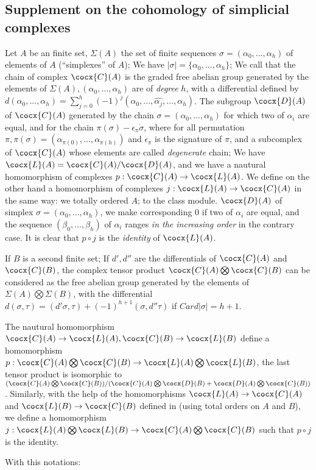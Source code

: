 \subsection{Supplement on the cohomology of simplicial complexes}
\label{subsection:0.11.8}
\begin{env}[11.8.1]
Let $A$ be an finite set, $\Sigma(A)$ the set of finite sequences $\sigma = (\alpha_0, ..., \alpha_h)$ of elements of $A$ (``simplexes'' of $A$);
We have $|\sigma| = \{\alpha_0, ..., \alpha_h\}$;
We call that the chain of complex $\cocx{C}(A)$ is the graded free abelian group generated by the elements of $\Sigma(A), (\alpha_0, ..., \alpha_h)$ are of \emph{degree} $h$, 
with a differential defined by $d(\alpha_0, ..., \alpha_h) = \sum_{j=0}^{h} (-1)^j(\alpha_0, ..., \hat{\alpha_j}, ..., \alpha_h)$.
The subgroup $\cocx{D}(A)$ of $\cocx{C}(A)$ generated by the chain $\sigma = (\alpha_0, ..., \alpha_h)$ for which two of $\alpha_i$ are equal, 
and for the chain $\pi(\sigma) - \epsilon_\pi \dot \sigma$, where for all permutation $\pi, \pi(\sigma) = (\alpha_{\pi(0)}, ..., \alpha_{\pi(h)})$ and $\epsilon_\pi$ is the signature of $\pi$, 
and a subcomplex of $\cocx{C}(A)$ whose elements are called \emph{degenerate} chain;
We have $\cocx{L}(A) = \cocx{C}(A) / \cocx{D}(A)$, and we have a nautural homomorphism of complexes $p: \cocx{C}(A) \rightarrow \cocx{L}(A)$.
We define on the other hand a homomorphism of complexes $j: \cocx{L}(A) \rightarrow \cocx{C}(A)$ in the same way: 
we totally ordered $A$; to the class module. $\cocx{D}(A)$ of simplex $\sigma = (\alpha_0, ..., \alpha_h)$, we make corresponding 0 if two of $\alpha_i$ are equal, 
and the sequence $(\beta_0, ..., \beta_h)$ of $\alpha_i$ ranges \emph{in the increasing order} in the contrary case.
It is clear that $p\circ j$ is the \emph{identity} of $\cocx{L}(A)$.
\end{env}

\begin{env}[11.8.2]
If $B$ is a second finite set; If $d', d''$ are the differentials of $\cocx{C}(A)$ and $\cocx{C}(B)$,
the complex tensor product $\cocx{C}(A) \bigotimes \cocx{C}(B)$ can be considered as the free abelian group generated by the elements of $\Sigma(A)\bigotimes\Sigma(B)$, 
with the differential $d(\sigma, \tau) = (d'\sigma, \tau) + (-1)^{h+1}(\sigma, d''\tau)$ if $Card|\sigma| = h + 1$.

The nautural homomorphism $\cocx{C}(A)\rightarrow \cocx{L}(A), \cocx{C}(B) \rightarrow \cocx{L}(B)$ define a homomorphism $p: \cocx{C}(A)\bigotimes\cocx{C}(B) \rightarrow \cocx{L}(A)\bigotimes\cocx{L}(B)$, 
the last tensor product is isomorphic to $(\cocx{C}(A)\bigotimes\cocx{C}(B))/(\cocx{C}(A)\bigotimes\cocx{D}(B) + \cocx{D}(A)\bigotimes\cocx{C}(B))$.
Similarly, with the help of the homomorphisms $\cocx{L}(A)\rightarrow\cocx{C}(A)$ and $\cocx{L}(B)\rightarrow\cocx{C}(B)$ defined in  
(using total orders on $A$ and $B$), we define a homomorphism $j: \cocx{L}(A)\bigotimes\cocx{L}(B) \rightarrow \cocx{C}(A)\bigotimes\cocx{C}(B)$ such that $p\circ j$ is the identity.

With this notations:
\end{env}

